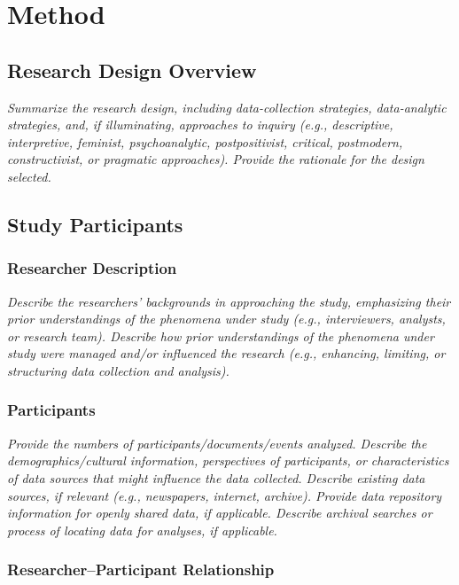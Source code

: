 \documentclass[acmsmall]{acmart}
\begin{document}
\section{Method}
\label{sec:method}

\subsection{Research Design Overview}

{\em\small  Summarize the research design, including data-collection strategies, data-analytic strategies, and, if illuminating, approaches to inquiry (e.g., descriptive, interpretive, feminist, psychoanalytic, postpositivist, critical, postmodern, constructivist, or pragmatic approaches). Provide the rationale for the design selected.}

\subsection{Study Participants}

\subsubsection{Researcher Description}

{\em\small Describe the researchers’ backgrounds in approaching the study, emphasizing their prior understandings of the phenomena under study (e.g., interviewers, analysts, or research team). Describe how prior understandings of the phenomena under study were managed and/or influenced the research (e.g., enhancing, limiting, or structuring data collection and analysis).}

\subsubsection{Participants}

{\em\small Provide the numbers of participants/documents/events analyzed. Describe the demographics/cultural information, perspectives of participants, or characteristics of data sources that might influence the data collected. Describe existing data sources, if relevant (e.g., newspapers, internet, archive). Provide data repository information for openly shared data, if applicable. Describe archival searches or process of locating data for analyses, if applicable. }


\subsubsection{Researcher–Participant Relationship}
\end{document}
